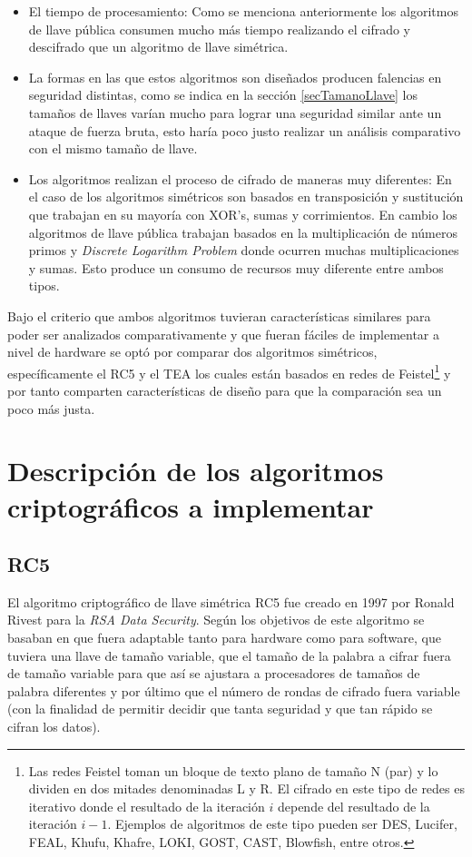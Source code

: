 \begin{itemize}
\item El tiempo de procesamiento: Como se menciona anteriormente los algoritmos de llave pública consumen mucho más tiempo realizando el cifrado y descifrado que un algoritmo de llave simétrica.

\item La formas en las que estos algoritmos son diseñados producen falencias en seguridad distintas, como se indica en la sección \ref{secTamanoLlave} los tamaños de llaves varían mucho para lograr una seguridad similar ante un ataque de fuerza bruta, esto haría poco justo realizar un análisis comparativo con el mismo tamaño de llave.

\item Los algoritmos realizan el proceso de cifrado de maneras muy diferentes: En el caso de los algoritmos simétricos son basados en transposición y sustitución que trabajan en su mayoría con XOR's, sumas y corrimientos. En cambio los algoritmos de llave pública trabajan  basados en la multiplicación de números primos y \textit{Discrete Logarithm Problem} donde ocurren muchas multiplicaciones y sumas. Esto produce un consumo de recursos muy diferente entre ambos tipos.
\end{itemize}

Bajo el criterio que ambos algoritmos tuvieran características similares para poder ser analizados comparativamente y que fueran fáciles de implementar a nivel de hardware se optó por comparar dos algoritmos simétricos, específicamente el RC5 y el TEA los cuales están basados en redes de Feistel\footnote{
Las redes Feistel toman un bloque de texto plano de tamaño N (par) y lo dividen en dos mitades denominadas L y R. El cifrado en este tipo de redes es iterativo donde el resultado de la iteración $i$ depende del resultado de la iteración $i - 1 $. Ejemplos de algoritmos de este tipo pueden ser DES, Lucifer, FEAL, Khufu, Khafre, LOKI, GOST, CAST, Blowfish, entre otros.} y por tanto comparten características de diseño para que la comparación sea un poco más justa.





\section{Descripción de los algoritmos criptográficos a implementar}
\subsection{RC5}
El algoritmo criptográfico de llave simétrica RC5 fue creado en 1997 por Ronald Rivest para la \textit{RSA Data Security}. Según \cite{rivest} los objetivos de este algoritmo se basaban en que fuera adaptable tanto para hardware como para software, que tuviera una llave de tamaño variable, que el tamaño de la palabra a cifrar fuera de tamaño variable para que así se ajustara a procesadores de tamaños de palabra diferentes y por último que el número de rondas de cifrado fuera variable (con la finalidad de permitir decidir que tanta seguridad y que tan rápido se cifran los datos).

